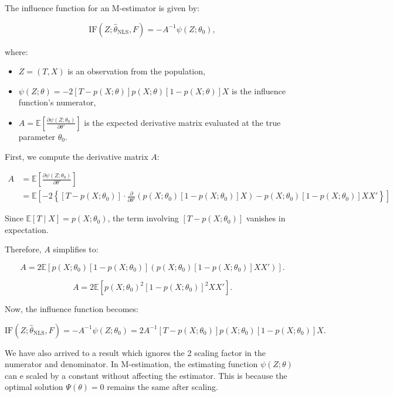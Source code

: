 \documentclass{article}
\begin{document}
The influence function for an M-estimator is given by:

\[
\text{IF}(Z; \hat{\theta}_{\text{NLS}}, F) = -A^{-1} \psi(Z; \theta_0),
\]

where:

\begin{itemize}
    \item \( Z = (T, X) \) is an observation from the population,
    \item \( \psi(Z; \theta) = -2 \left[ T - p(X; \theta) \right] p(X; \theta) [1 - p(X; \theta)] X \) is the influence function's numerator,
    \item \( A = \mathbb{E} \left[ \frac{\partial \psi(Z; \theta_0)}{\partial \theta'} \right] \) is the expected derivative matrix evaluated at the true parameter \( \theta_0 \).
\end{itemize}

First, we compute the derivative matrix \( A \):

\begin{align*}
  A
  &= \mathbb{E} \left[ \frac{\partial \psi(Z; \theta_0)}{\partial \theta'} \right] \\
  &= \mathbb{E} \left[ -2 \left\{ [T - p(X; \theta_0)] \cdot \frac{\partial}{\partial \theta'} \left( p(X; \theta_0) [1 - p(X; \theta_0)] X \right) - p(X; \theta_0) [1 - p(X; \theta_0)] X X' \right\} \right]
\end{align*}

Since \( \mathbb{E}[T \mid X] = p(X; \theta_0) \), the term involving \( [T - p(X; \theta_0)] \) vanishes in expectation. 

Therefore, \( A \) simplifies to:

\[
A = 2 \mathbb{E} \left[ p(X; \theta_0) [1 - p(X; \theta_0)] \left( p(X; \theta_0) [1 - p(X; \theta_0)] X X' \right) \right].
\]

\[
A = 2 \mathbb{E} \left[ p(X; \theta_0)^2 [1 - p(X; \theta_0)]^2 X X' \right].
\]

Now, the influence function becomes:

\[
\text{IF}(Z; \hat{\theta}_{\text{NLS}}, F) = -A^{-1} \psi(Z; \theta_0) = 2 A^{-1} [T - p(X; \theta_0)] p(X; \theta_0) [1 - p(X; \theta_0)] X.
\]

We have also arrived to a result which ignores the 2 scaling factor in the numerator and denominator. In M-estimation, the estimating function $\psi(Z; \theta)$ can e scaled by a constant without affecting the estimator. This is because the optimal solution $\Psi(\theta) = 0$ remains the same after scaling.
\end{document}
